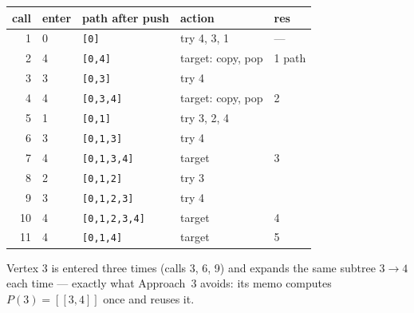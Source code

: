 \begin{tracebox}
\begin{center}
\end{center}
\begin{center}\small
\begin{tabular}{@{}rllll@{}}
\toprule
\textbf{call} & \textbf{enter} & \textbf{path after push} & \textbf{action} & \textbf{res} \\
\midrule
1 & 0 & \texttt{[0]} & try 4, 3, 1 & --- \\
2 & 4 & \texttt{[0,4]} & target: copy, pop & 1 path \\
3 & 3 & \texttt{[0,3]} & try 4 & \\
4 & 4 & \texttt{[0,3,4]} & target: copy, pop & 2 \\
5 & 1 & \texttt{[0,1]} & try 3, 2, 4 & \\
6 & 3 & \texttt{[0,1,3]} & try 4 & \\
7 & 4 & \texttt{[0,1,3,4]} & target & 3 \\
8 & 2 & \texttt{[0,1,2]} & try 3 & \\
9 & 3 & \texttt{[0,1,2,3]} & try 4 & \\
10 & 4 & \texttt{[0,1,2,3,4]} & target & 4 \\
11 & 4 & \texttt{[0,1,4]} & target & 5 \\
\bottomrule
\end{tabular}
\end{center}
Vertex 3 is entered three times (calls 3, 6, 9) and expands the same subtree $3 \to 4$ each time --- exactly what Approach~3 avoids: its memo computes $P(3) = [[3,4]]$ once and reuses it.
\end{tracebox}

